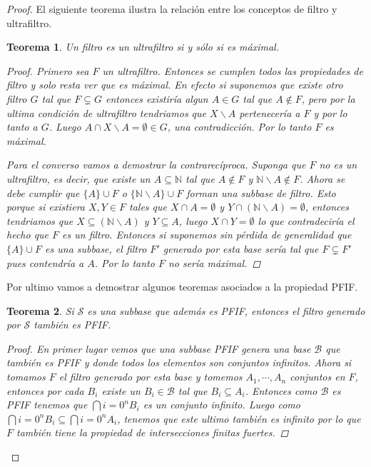 \documentclass[letter,twoside,12pt]{article}
\newtheorem{theo}{Teorema}
\begin{document}
\begin{enumerate}
\begin{proof}
El siguiente teorema ilustra la relación entre los conceptos de filtro y ultrafiltro.

\begin{theo}
Un filtro es un ultrafiltro si y sólo si es máximal.
\begin{proof}
Primero sea $ F $ un ultrafiltro. Entonces se cumplen todos las propiedades de filtro y solo resta ver que es máximal. En efecto si suponemos que existe otro filtro $ G $ tal que $ F \subsetneq G $ entonces existiría algun $ A \in G $ tal que $ A \not \in F $, pero por la ultima condición de ultrafiltro tendriamos que $ X \backslash A $ pertenecería a $ F $ y por lo tanto a $ G $. Luego $ A \cap X \backslash A = \emptyset \in G $, una contradicción. Por lo tanto $ F $ es máximal.

Para el converso vamos a demostrar la contrarecíproca. Suponga que $ F $ no es un ultrafiltro, es decir, que existe un $ A \subseteq  \mathbb{N}$ tal que $ A \not \in F $ y $ \mathbb{N} \backslash A \not \in F $. Ahora se debe cumplir que $ \{A\} \cup F$ o $ \{\mathbb{N} \backslash A\}\cup F $ forman una subbase de filtro. Esto porque si existiera $ X , Y \in F $ tales que $ X \cap A = \emptyset $ y $ Y \cap (\mathbb{N} \backslash A) = \emptyset $, entonces tendriamos que $ X \subseteq (\mathbb{N} \backslash A) $ y $ Y \subseteq A $, luego $ X \cap Y = \emptyset $ lo que contradeciría el hecho que $ F $ es un filtro. Entonces si suponemos sin pérdida de generalidad que $ \{A\} \cup F$ es una subbase, el filtro $ F' $ generado por esta base sería tal que $ F \subsetneq F' $ pues contendría a $ A $. Por lo tanto $ F $ no sería máximal.
\end{proof}
\end{theo}

Por ultimo vamos a demostrar algunos teoremas asociados a la propiedad PFIF.

\begin{theo}
Si $ \mathcal{S} $ es una subbase que además es PFIF, entonces el filtro generado por $ \mathcal{S} $ también es PFIF.

\begin{proof}
En primer lugar vemos que una subbase PFIF genera una base $ \mathcal{B} $ que también es PFIF y donde todos los elementos son conjuntos infinitos. Ahora si tomamos $ F $ el filtro generado por esta base y tomemos $ A_1,\cdots, A_n $ conjuntos en $ F $, entonces por cada $ B_i $ existe un $ B_i \in \mathcal{B}$ tal que $ B_i \subseteq A_i $. Entonces como $ \mathcal{B} $ es PFIF tenemos que $ \bigcap{i=0}^n B_i$ es un conjunto infinito. Luego como $\bigcap{i=0}^n B_i \subseteq \bigcap{i=0}^n A_i $, tenemos que este ultimo también es infinito por lo que $ F $ también tiene la propiedad de intersecciones finitas fuertes.
\end{proof}
\end{theo}


\end{proof}
\end{enumerate}
\end{document}
